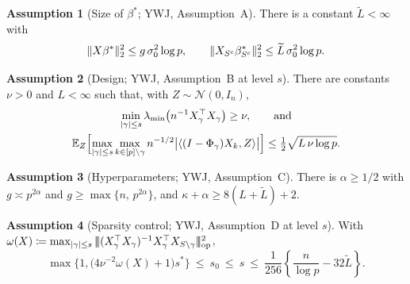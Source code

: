 \documentclass[aos]{imsart}
\DeclarePairedDelimiter{\norm}{\lVert}{\rVert}
\DeclarePairedDelimiter{\abs}{\lvert}{\rvert}
\newcommand{\bbE}[0]{\mathbb{E}}
\newcommand{\calN}[0]{\mathcal{N}}
\newcommand{\opnorm}[1]{|\!|\!|#1|\!|\!|_{\mathrm{op}}}
\newcommand{\Ltil}{\widetilde{L}}
\theoremstyle{plain}
\theoremstyle{definition}
\newtheorem{assumption}{Assumption}[section]
\begin{document}
    \begin{assumption}[Size of $\beta^\ast$; YWJ, Assumption~A]
        \label{ass:A}
        There is a constant $\Ltil<\infty$ with
        \begin{equation*}
            \norm{X\beta^\ast}_2^{2}\leq g\,\sigma_0^{2}\log p,
            \qquad
            \norm{X_{S^{c}}\beta^\ast_{S^{c}}}_2^{2}
            \leq\Ltil\,\sigma_0^{2}\log p .
        \end{equation*}
    \end{assumption}

    \begin{assumption}[Design; YWJ, Assumption~B at level $s$]
        \label{ass:B}
        There are constants $\nu>0$ and $L<\infty$ such that, with
        $Z\sim\calN(0,I_n)$,
        \begin{gather*}
            \min_{\abs{\gamma}\leq s}
            \lambda_{\min}\bigl(n^{-1}X_\gamma^{\top}X_\gamma\bigr)\geq\nu,
            \qquad\text{and}\\
            \bbE_Z\Bigl[\max_{\abs{\gamma}\leq s}
            \max_{k\in[p]\setminus\gamma}
            n^{-1/2}\bigl|\langle(I-\Phi_\gamma)X_k,Z\rangle\bigr|\Bigr]
            \leq\tfrac12\sqrt{L\,\nu\log p}.
        \end{gather*}
    \end{assumption}

    \begin{assumption}[Hyperparameters; YWJ, Assumption~C]
        \label{ass:C}
        There is $\alpha\ge 1/2$ with $g\asymp p^{2\alpha}$ and
        $g\geq\max\{n,\,p^{2\alpha}\}$, and $\kappa+\alpha\geq
        8(L+\Ltil)+2$.
    \end{assumption}


    \begin{assumption}[Sparsity control; YWJ, Assumption~D at level $s$]
        \label{ass:D}
        With
        $\omega(X)\coloneq\max_{\abs \gamma\leq s}
        \opnorm{(X_\gamma^{\top}X_\gamma)^{-1}X_\gamma^{\top}
            X_{S\setminus\gamma}}^{2}$,
        \begin{equation}
            \label{eq:Dassumption}
            \max\{1, \bigl(4\nu^{-2}\omega(X)+1\bigr)s^{\ast}\}
            \ \leq\ s_0\ \leq\ s\ \leq\
            \frac{1}{256}\left\{\frac{n}{\log p}-32\Ltil\right\} .
        \end{equation}
    \end{assumption}
\end{document}
